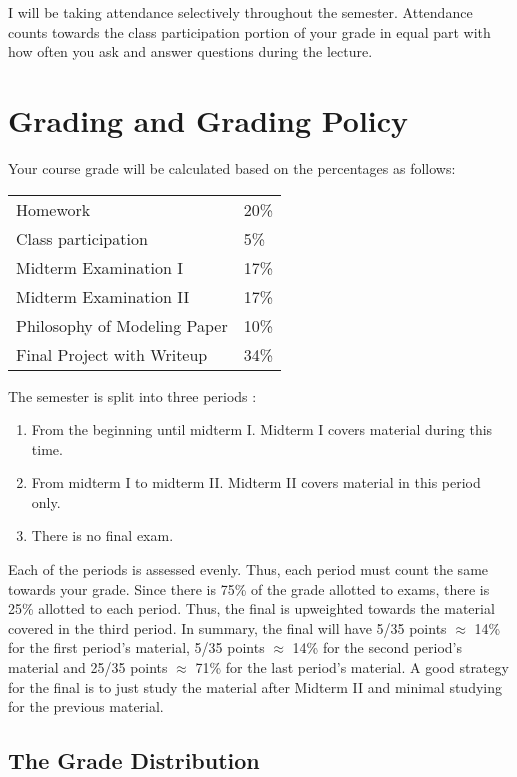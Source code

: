 \documentclass[12pt]{article}
\begin{document}
I will be taking attendance selectively throughout the semester. Attendance counts towards the class participation portion of your grade in equal part with how often you ask and answer questions during the lecture.


\section*{Grading and Grading Policy}\label{sec:grading}

Your course grade will be calculated based on the percentages as follows: 

\begin{table}[h]
\centering
\begin{tabular}{l|l}
Homework & 20\% \\
Class participation & 5\% \\
Midterm Examination I & 17\%\\
Midterm Examination II & 17\%\\
Philosophy of Modeling Paper & 10\% \\
Final Project with Writeup & 34\%
\end{tabular}
\end{table}
\FloatBarrier

The semester is split into three periods :

\begin{enumerate}
\item From the beginning until midterm I. Midterm I covers material during this time.
\item From midterm I to midterm II. Midterm II covers material in this period only. 
\item There is no final exam.
\end{enumerate}

Each of the periods is assessed evenly. Thus, each period must count the same towards your grade. Since there is 75\% of the grade allotted to exams, there is 25\% allotted to each period. Thus, the final is upweighted towards the material covered in the third period. In summary, the final will have 5/35 points $\approx$ 14\% for the first period's material, 5/35 points $\approx$ 14\% for the second period's material and 25/35 points $\approx$ 71\% for the last period's material. A good strategy for the final is to just study the material after Midterm II and minimal studying for the previous material.

\subsection*{The Grade Distribution}
\end{document}
